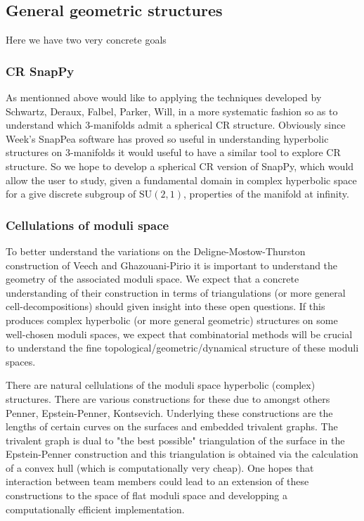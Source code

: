 \documentclass[14pt,fleqn]{article}
\begin{document}
\subsection{General geometric structures}

Here we have two very concrete goals

\subsubsection{CR SnapPy}
As mentionned above would like to applying the  techniques developed 
by Schwartz, Deraux, Falbel, Parker, Will, in a
more systematic fashion so as to understand
which 3-manifolds admit a spherical CR structure.
Obviously since Week's SnapPea software 
has proved so useful in understanding 
hyperbolic structures on 3-manifolds
it would useful to have a similar tool
to explore CR structure.
So we hope to develop a spherical CR version of SnapPy,
which would allow the user to study, 
given a fundamental domain 
in complex hyperbolic space  for a
give discrete subgroup of $\mathrm{SU}(2,1)$, properties of the  manifold at infinity.


\subsubsection{Cellulations of moduli space}

To better understand the variations 
on the Deligne-Mostow-Thurston construction
of  Veech and Ghazouani-Pirio
it is important to understand the geometry
of the associated moduli space.
We expect that a concrete understanding of their construction in terms of triangulations (or more general cell-decompositions) should given
insight into these open questions. 
If this produces complex hyperbolic
(or more general geometric) structures on some well-chosen moduli spaces, we expect that combinatorial methods will be crucial to understand the fine topological/geometric/dynamical structure of these
moduli spaces.

There are  natural cellulations of 
the moduli space hyperbolic (complex)  structures.
There are various constructions for these
due to amongst others Penner, Epstein-Penner,  Kontsevich.
Underlying these constructions 
are the lengths of certain curves on the surfaces
and embedded trivalent graphs.
The trivalent graph is dual to 
"the best possible" triangulation of the surface
in the Epstein-Penner construction
and this triangulation is obtained 
via the calculation of a convex hull
(which is computationally very cheap).
One hopes that interaction between team members
could lead to an extension of these constructions
to the space of flat moduli space 
and developping a computationally efficient
implementation.
 
\end{document}
